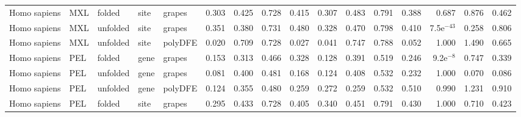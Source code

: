 \begin{longtable}{lllllrrrrrrrrrrr}
        Homo sapiens &                       MXL &    folded &  site &   grapes &                              0.303 &                               0.425 &                 0.728 &                 0.415 &                              0.307 &                               0.483 &                 0.791 &                 0.388 &         0.687 &  0.876 &  0.462 \\
        Homo sapiens &                       MXL &  unfolded &  site &   grapes &                              0.351 &                               0.380 &                 0.731 &                 0.480 &                              0.328 &                               0.470 &                 0.798 &                 0.410 &  7.5e$^{-43}$ &  0.258 &  0.806 \\
        Homo sapiens &                       MXL &  unfolded &  site &  polyDFE &                              0.020 &                               0.709 &                 0.728 &                 0.027 &                              0.041 &                               0.747 &                 0.788 &                 0.052 &         1.000 &  1.490 &  0.665 \\
        Homo sapiens &                       PEL &    folded &  gene &   grapes &                              0.153 &                               0.313 &                 0.466 &                 0.328 &                              0.128 &                               0.391 &                 0.519 &                 0.246 &   9.2e$^{-8}$ &  0.747 &  0.339 \\
        Homo sapiens &                       PEL &  unfolded &  gene &   grapes &                              0.081 &                               0.400 &                 0.481 &                 0.168 &                              0.124 &                               0.408 &                 0.532 &                 0.232 &         1.000 &  0.070 &  0.086 \\
        Homo sapiens &                       PEL &  unfolded &  gene &  polyDFE &                              0.124 &                               0.355 &                 0.480 &                 0.259 &                              0.272 &                               0.259 &                 0.532 &                 0.510 &         0.990 &  1.231 &  0.910 \\
        Homo sapiens &                       PEL &    folded &  site &   grapes &                              0.295 &                               0.433 &                 0.728 &                 0.405 &                              0.340 &                               0.451 &                 0.791 &                 0.430 &         1.000 &  0.710 &  0.423 \\

\end{longtable}
